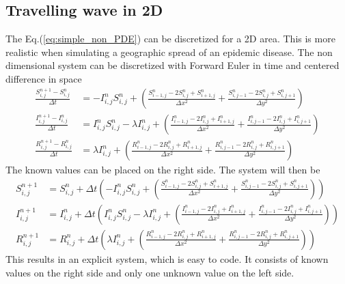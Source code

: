 \documentclass[%
twoside,                 %
final,                   %
chapterprefix=true,      %
open=right               %
10pt]{book}
\begin{document}
\subsection{Travelling wave in 2D}
The Eq.(\ref{eq:simple_non_PDE}) can be discretized for a 2D area. This is more realistic when simulating a geographic spread of an epidemic disease. The non dimensional system  can be discretized with Forward Euler in time and centered difference in space
\begin{equation} \label{eq:SIR_disc}
	\begin{aligned}
    \frac{S^{n+1}_{i,j}-S^n_{i,j}}{\Delta t} &= -I^{n}_{i,j}S^{n}_{i,j} + \left(\frac{S^{n}_{i-1,j}-2S^{n}_{i,j}+S^{n}_{i+1,j}}{\Delta x^2}+\frac{S^{n}_{i,j-1}-2S^{n}_{i,j}+S^{n}_{i,j+1}}{\Delta y^2}\right) \\
    \frac{I^{n+1}_{i,j}-I^n_{i,j}}{\Delta t} &= I^{n}_{i,j}S^{n}_{i,j} -\lambda I^{n}_{i,j} + \left(\frac{I^{n}_{i-1,j}-2I^{n}_{i,j}+I^{n}_{i+1,j}}{\Delta x^2}+\frac{I^{n}_{i,j-1}-2I^{n}_{i,j}+I^{n}_{i,j+1}}{\Delta y^2}\right) \\
    \frac{R^{n+1}_{i,j}-R^n_{i,j}}{\Delta t} &= \lambda I^{n}_{i,j}+\left(\frac{R^{n}_{i-1,j}-2R^{n}_{i,j}+R^{n}_{i+1,j}}{\Delta x^2}+\frac{R^{n}_{i,j-1}-2R^{n}_{i,j}+R^{n}_{i,j+1}}{\Delta y^2}\right) 
	\end{aligned}
\end{equation}
The known values can be placed on the right side. The system will then be
\begin{equation}
	\begin{aligned}
    S^{n+1}_{i,j} &= S^{n}_{i,j}+\Delta t\left(-I^{n}_{i,j}S^{n}_{i,j} + \left(\frac{S^{n}_{i-1,j}-2S^{n}_{i,j}+S^{n}_{i+1,j}}{\Delta x^2}+\frac{S^{n}_{i,j-1}-2S^{n}_{i,j}+S^{n}_{i,j+1}}{\Delta y^2}\right)\right) \\
    I^{n+1}_{i,j} &= I^{n}_{i,j}+\Delta t\left(I^{n}_{i,j}S^{n}_{i,j} -\lambda I^{n}_{i,j} + \left(\frac{I^{n}_{i-1,j}-2I^{n}_{i,j}+I^{n}_{i+1,j}}{\Delta x^2}+\frac{I^{n}_{i,j-1}-2I^{n}_{i,j}+I^{n}_{i,j+1}}{\Delta y^2}\right)\right) \\
    R^{n+1}_{i,j} &= R^{n}_{i,j}+\Delta t\left(\lambda I^{n}_{i,j}+\left(\frac{R^{n}_{i-1,j}-2R^{n}_{i,j}+R^{n}_{i+1,j}}{\Delta x^2}+\frac{R^{n}_{i,j-1}-2R^{n}_{i,j}+R^{n}_{i,j+1}}{\Delta y^2}\right)\right) 
	\end{aligned}
\end{equation}
This results in an explicit system, which is easy to code. It consists of known values on the right side and only one unknown value on the left side.
\end{document}
